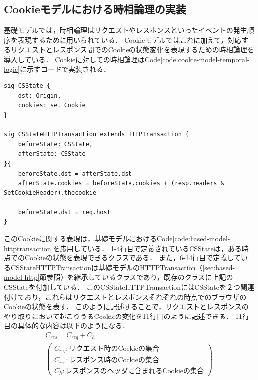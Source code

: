 \documentclass[12pt,a4paper]{jbook}
\begin{document}
\subsection{Cookieモデルにおける時相論理の実装}
基礎モデルでは，時相論理はリクエストやレスポンスといったイベントの発生順序を表現するために用いられている．
Cookieモデルではこれに加えて，対応するリクエストとレスポンス間でのCookieの状態変化を表現するための時相論理を導入している．
Cookieに対しての時相論理はCode\ref{code:cookie-model-temporal-logic}に示すコードで実装される．
\begin{lstlisting}[caption=Cookieに対する時相論理, label=code:cookie-model-temporal-logic]
sig CSState {
	dst: Origin,
	cookies: set Cookie
}

sig CSStateHTTPTransaction extends HTTPTransaction {
	beforeState: CSState,
	afterState: CSState
}{
	beforeState.dst = afterState.dst
	afterState.cookies = beforeState.cookies + (resp.headers & SetCookieHeader).thecookie
	
	beforeState.dst = req.host
}
\end{lstlisting}
このCookieに関する表現は，基礎モデルにおけるCode\ref{code:based-model-httptransaction}を応用している．
1-4行目で定義されているCSStateは，ある時点でのCookieの状態を表現できるクラスである．
また，6-14行目で定義しているCSStateHTTPTransactionは基礎モデルのHTTPTransaction（\ref{sec:based-model-http}節参照）を継承しているクラスであり，既存のクラスに上記のCSStateを付加している．
このCSStateHTTPTransactionにはCSStateを２つ関連付けており，これらはリクエストとレスポンスそれぞれの時点でのブラウザのCookieの状態を表す．
このように記述することで，リクエストとレスポンスのやり取りにおいて起こりうるCookieの変化を11行目のように記述できる．
11行目の具体的な内容は以下のようになる．
\begin{eqnarray*}
& C_{res} = C_{req} + C_{h} &\\
& \left(
\begin{array}{l}
	C_{req} : \mbox{リクエスト時のCookieの集合}\\
	C_{res} : \mbox{レスポンス時のCookieの集合}\\
	C_{h} : \mbox{レスポンスのヘッダに含まれるCookieの集合}
\end{array}
\right) &
\end{eqnarray*}
\end{document}

